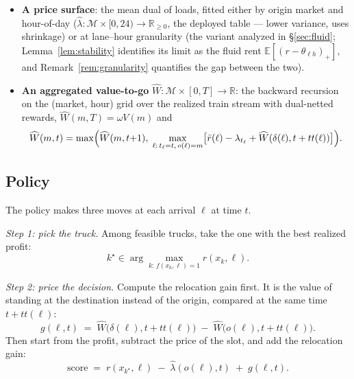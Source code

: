 \documentclass[11pt]{article}
\begin{document}
\begin{itemize}
\item \textbf{A price surface}: the mean dual of loads, fitted either
  by origin market and hour-of-day
  ($\hat{\lambda} : \mathcal{M} \times [0, 24) \to \mathbb{R}_{\geq 0}$,
  the deployed table --- lower variance, uses shrinkage) or at
  lane--hour granularity (the variant analyzed in
  \S\ref{sec:fluid}; Lemma~\ref{lem:stability} identifies its limit as
  the fluid rent $\mathbb{E}[(r - \theta_{\ell h})_+]$, and
  Remark~\ref{rem:granularity} quantifies the gap between the two).
\item \textbf{An aggregated value-to-go}
  $\widehat{W} : \mathcal{M} \times [0, T] \to \mathbb{R}$: the backward
  recursion on the (market, hour) grid over the realized train stream
  with dual-netted rewards, $\widehat{W}(m, T) = \omega V(m)$ and
  \begin{equation}
    \widehat{W}(m, t) = \max\Bigl( \widehat{W}(m, t{+}1),\;
    \max_{\ell:\, t_\ell = t,\, o(\ell) = m}
    \bigl[ \bar{r}(\ell) - \lambda_{t_\ell}
    + \widehat{W}(\delta(\ell), t + tt(\ell)) \bigr] \Bigr).
    \label{eq:wrec}
  \end{equation}
\end{itemize}

\subsection{Policy}
\label{sec:policydef}

The policy makes three moves at each arrival $\ell$ at time $t$.

\emph{Step 1: pick the truck.} Among feasible trucks, take the one
with the best realized profit:
\begin{equation}
  k^{\star} \in \arg\max_{k :\, f(x_k, \ell) = 1} r(x_k, \ell).
\end{equation}

\emph{Step 2: price the decision.} Compute the relocation gain first.
It is the value of standing at the destination instead of the origin,
compared at the same time $t + tt(\ell)$:
\begin{equation}
  g(\ell, t) \;=\; \widehat{W}\bigl(\delta(\ell), t + tt(\ell)\bigr)
  \;-\; \widehat{W}\bigl(o(\ell), t + tt(\ell)\bigr).
  \label{eq:gradient}
\end{equation}
Then start from the profit, subtract the price of the slot, and add the
relocation gain:
\begin{equation}
  \mathrm{score} \;=\; r(x_{k^{\star}}, \ell)
  \;-\; \hat{\lambda}(o(\ell), t) \;+\; g(\ell, t).
  \label{eq:policy}
\end{equation}
\end{document}
